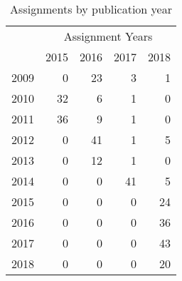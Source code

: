 \begin{table}[ht]
\centering
\caption{Assignments by publication year} 
\label{tab:assignments}
\begin{tabular}{rrrrr}
  &\multicolumn{5}{c}{Assignment Years}\\ & 2015 & 2016 & 2017 & 2018 \\ 
  \hline
2009 &   0 &  23 &   3 &   1 \\ 
  2010 &  32 &   6 &   1 &   0 \\ 
  2011 &  36 &   9 &   1 &   0 \\ 
  2012 &   0 &  41 &   1 &   5 \\ 
  2013 &   0 &  12 &   1 &   0 \\ 
  2014 &   0 &   0 &  41 &   5 \\ 
  2015 &   0 &   0 &   0 &  24 \\ 
  2016 &   0 &   0 &   0 &  36 \\ 
  2017 &   0 &   0 &   0 &  43 \\ 
  2018 &   0 &   0 &   0 &  20 \\ 
   \hline
\end{tabular}
\end{table}
